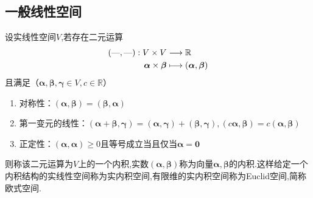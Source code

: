 \subsection{一般线性空间}
\begin{formal}
    \begin{definition}[实内积空间的定义]\label{def:实内积空间的定义}
        设实线性空间$V$,若存在二元运算\begin{align*}
            \left(\text{---},\text{---}\right):V\times V&\longrightarrow\mathbb{R}\\
            \bm{\alpha}\times\bm{\beta}&\longmapsto\left(\bm{\alpha},\bm{\beta}\right)
        \end{align*}且满足（$\bm{\alpha},\bm{\beta},\bm{\gamma}\in V,c\in\mathbb{R}$）\begin{enumerate}[label={\textup{(\arabic*)}}]
            \item 对称性：$\left(\bm{\alpha},\bm{\beta}\right)=\left(\bm{\beta},\bm{\alpha}\right)$
            \item 第一变元的线性：$\left(\bm{\alpha}+\bm{\beta},\bm{\gamma}\right)=\left(\bm{\alpha},\bm{\gamma}\right)+\left(\bm{\beta},\bm{\gamma}\right),\left(c\bm{\alpha},\bm{\beta}\right)=c\left(\bm{\alpha},\bm{\beta}\right)$
            \item 正定性：$\left(\bm{\alpha},\bm{\alpha}\right)\geqslant 0$且等号成立当且仅当$\bm{\alpha}=\bm{0}$
        \end{enumerate}则称该二元运算为$V$上的一个内积,实数$\left(\bm{\alpha},\bm{\beta}\right)$称为向量$\bm{\alpha},\bm{\beta}$的内积.这样给定一个内积结构的实线性空间称为实内积空间,有限维的实内积空间称为\textup{Euclid}空间,简称欧式空间.
    \end{definition}
\end{formal}

